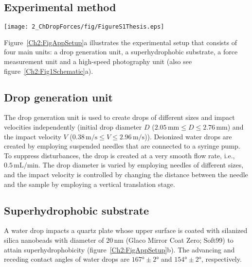 \begin{subappendices}
	
	\section{Experimental method}\label{sec:ExpMethods}

	\begin{sidewaysfigure}
		\centering
		\texttt{[image: 2\_ChDropForces/fig/FigureS1Thesis.eps]}
		\caption{(a) Experimental setup, consisting of four main units: a drop generation unit, a superhydrophobic substrate, a force measurement unit, and a high-speed photography unit. Relevant appurtenant devices are shown. Also see figure~\ref{Ch2:Fig1Schematic}(a). (b) Snapshot of a water drop sitting on a superhydrophobic substrate with overlaid orange boundary from simulation. The inset shows the scanning electron microscopy (SEM) image of the superhydrophobic surface covered by hydrophobic nanoparticles.}
		\label{Ch2:FigAppSetup}
	\end{sidewaysfigure}

	Figure~\ref{Ch2:FigAppSetup}a illustrates the experimental setup that consists of four main units: a drop generation unit, a superhydrophobic substrate, a force measurement unit and a high-speed photography unit (also see figure~\ref{Ch2:Fig1Schematic}a). 
	
	\subsection{Drop generation unit}
	
	The drop generation unit is used to create drops of different sizes and impact velocities independently (initial drop diameter $D$ ($2.05\,\si{\milli\meter} \le D \le 2.76\,\si{\milli\meter}$) and the impact velocity $V$ ($0.38\,\si{\meter}/\si{\second} \le V \le 2.96\,\si{\meter}/\si{\second}$)). Deionized water drops are created by employing suspended needles that are connected to a syringe pump. To suppress disturbances, the drop is created at a very smooth flow rate, i.e., $0.5\,\si{\milli\liter}/\si{\minute}$. The drop diameter is varied by employing needles of different sizes, and the impact velocity is controlled by changing the distance between the needle and the sample by employing a vertical translation stage.
	
	\subsection{Superhydrophobic substrate}\label{Ch2:sec::substrate}
	A water drop impacts a quartz plate whose upper surface is coated with silanized silica nanobeads with diameter of $20\,\si{\nano\meter}$ (Glaco Mirror Coat Zero; Soft99) \cite{li2017, gauthier2015}  to attain superhydrophobicity (figure~\ref{Ch2:FigAppSetup}b). The advancing and receding contact angles of water drops are $167\si{\degree} \pm 2\si{\degree}$ and $154\si{\degree} \pm 2\si{\degree}$, respectively. 
	

\end{subappendices}
